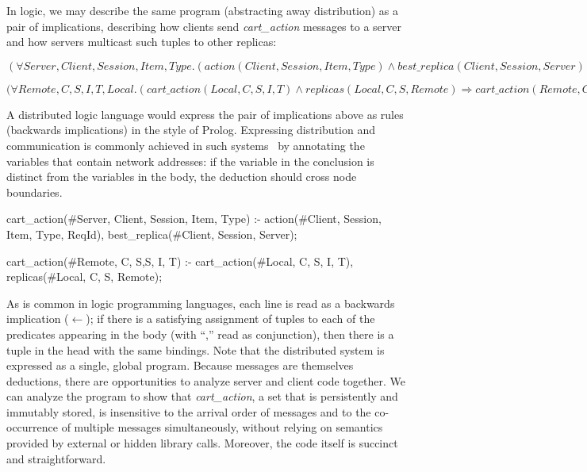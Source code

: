
In logic, we may describe the same program (abstracting away distribution)
as a pair of implications, describing how clients send {\em cart\_action}
messages to a server and how servers multicast such tuples to other replicas:

$(\forall Server, Client, Session, Item, Type . ( action(Client, Session, Item, Type) 
\land best\_replica(Client, Session, Server) ) \Rightarrow cart\_action(Server, Client, Session, Item, Type)) $


$(\forall Remote, C, S, I, T, Local . (cart\_action(Local, C, S, I, T) \land
replicas(Local, C, S, Remote) \Rightarrow cart\_action(Remote, C, S, I, T))
$

A distributed logic language would express the pair of implications above as rules
(backwards implications) in the style of Prolog.  Expressing distribution and communication
is commonly achieved in such systems~\cite{loo-sigmod06} by annotating the variables that 
contain network addresses: if the variable in the conclusion is distinct from the variables in
the body, the deduction should cross node boundaries.

\begin{Dedalus}
cart\_action(#Server, Client, Session, Item, Type) :-
  action(#Client, Session, Item, Type, ReqId),
  best_replica(#Client, Session, Server);

cart\_action(#Remote, C, S,S, I, T) :-
  cart\_action(#Local, C, S, I, T),
  replicas(#Local, C, S, Remote);
\end{Dedalus}

As is common in logic programming languages, each line is read as a backwards
implication ($\leftarrow$); if there is a satisfying assignment of tuples to each of
the predicates appearing in the body (with ``,'' read as conjunction), 
then there is a tuple in the head with the same bindings.
Note that the distributed system is expressed as a single, global program.
Because messages are themselves deductions, there are opportunities to 
analyze server and client code together.  We can analyze the program to 
show that {\em cart\_action}, a set that is persistently and immutably
stored, is insensitive to the arrival order of messages 
and to the co-occurrence of multiple messages simultaneously, without relying
on semantics provided by external or hidden library calls. Moreover, the code 
itself is succinct and straightforward. 




